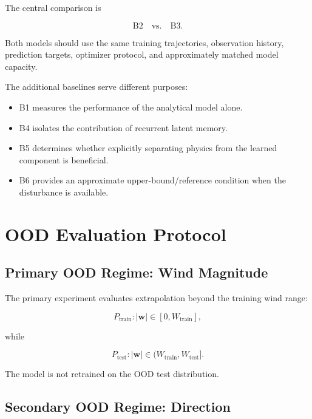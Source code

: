 \documentclass[conference]{IEEEtran}
\begin{document}
The central comparison is

\begin{equation}
\boxed{
\mathrm{B2}
\quad\text{vs.}\quad
\mathrm{B3}.
}
\end{equation}

Both models should use the same training trajectories, observation
history, prediction targets, optimizer protocol, and approximately
matched model capacity.

The additional baselines serve different purposes:

\begin{itemize}
    \item B1 measures the performance of the analytical model alone.
    \item B4 isolates the contribution of recurrent latent memory.
    \item B5 determines whether explicitly separating physics from the
    learned component is beneficial.
    \item B6 provides an approximate upper-bound/reference condition when
    the disturbance is available.
\end{itemize}


\section{OOD Evaluation Protocol}


\subsection{Primary OOD Regime: Wind Magnitude}

The primary experiment evaluates extrapolation beyond the training
wind range:

\begin{equation}
P_{\mathrm{train}}
:
|\mathbf w|\in[0,W_{\mathrm{train}}],
\end{equation}

while

\begin{equation}
P_{\mathrm{test}}
:
|\mathbf w|\in
(W_{\mathrm{train}},W_{\mathrm{test}}].
\end{equation}

The model is not retrained on the OOD test distribution.


\subsection{Secondary OOD Regime: Direction}
\end{document}
